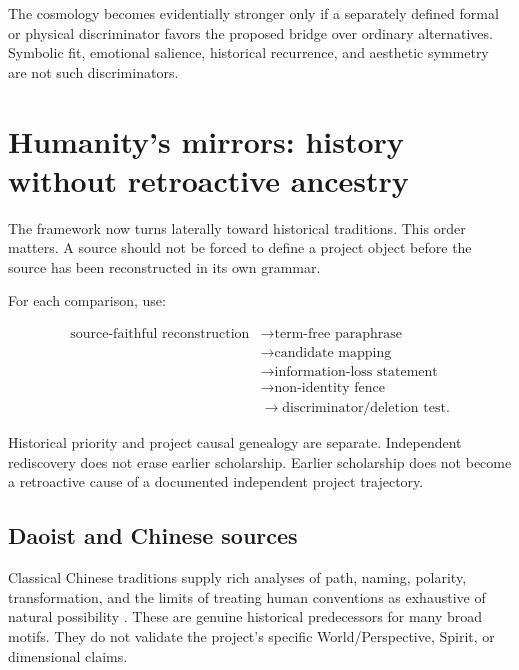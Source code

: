 \documentclass[11pt]{article}
\begin{document}
\begin{cruxbox}
The cosmology becomes evidentially stronger only if a separately defined formal
or physical discriminator favors the proposed bridge over ordinary alternatives.
Symbolic fit, emotional salience, historical recurrence, and aesthetic symmetry
are not such discriminators.
\end{cruxbox}

\section{Humanity's mirrors: history without retroactive ancestry}

The framework now turns laterally toward historical traditions. This order matters. A source should not be forced to define a project object before the source has been reconstructed in its own grammar.

For each comparison, use:

\begin{equation}
\begin{aligned}
\text{source-faithful reconstruction}
&\rightarrow \text{term-free paraphrase}\\
&\rightarrow \text{candidate mapping}\\
&\rightarrow \text{information-loss statement}\\
&\rightarrow \text{non-identity fence}\\
&\rightarrow \text{discriminator/deletion test}.
\end{aligned}
\end{equation}

Historical priority and project causal genealogy are separate. Independent rediscovery does not erase earlier scholarship. Earlier scholarship does not become a retroactive cause of a documented independent project trajectory.

\subsection{Daoist and Chinese sources}

Classical Chinese traditions supply rich analyses of path, naming, polarity, transformation, and the limits of treating human conventions as exhaustive of natural possibility \cite{Hansen2025Daoism,SEPChineseMetaphysics2023,Wang2013Yinyang}. These are genuine historical predecessors for many broad motifs. They do not validate the project's specific World/Perspective, Spirit, or dimensional claims.
\end{document}
